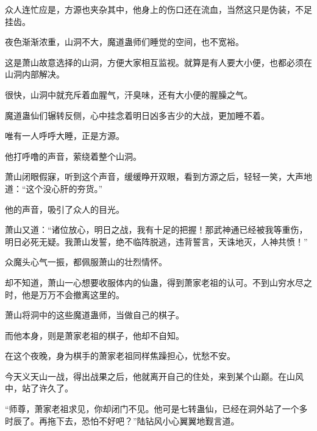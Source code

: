 \begin{this_body}
众人连忙应是，方源也夹杂其中，他身上的伤口还在流血，当然这只是伪装，不足挂齿。

夜色渐渐浓重，山洞不大，魔道蛊师们睡觉的空间，也不宽裕。

这是萧山故意选择的山洞，方便大家相互监视。就算是有人要大小便，也都必须在山洞内部解决。

很快，山洞中就充斥着血腥气，汗臭味，还有大小便的腥臊之气。

魔道蛊仙们辗转反侧，心中挂念着明日凶多吉少的大战，更加睡不着。

唯有一人呼呼大睡，正是方源。

他打呼噜的声音，萦绕着整个山洞。

萧山闭眼假寐，听到这个声音，缓缓睁开双眼，看到方源之后，轻轻一笑，大声地道：“这个没心肝的夯货。”

他的声音，吸引了众人的目光。

萧山又道：“诸位放心，明日之战，我有十足的把握！那武神通已经被我等重伤，明日必死无疑。我萧山发誓，绝不临阵脱逃，违背誓言，天诛地灭，人神共愤！”

众魔头心气一振，都佩服萧山的壮烈情怀。

却不知道，萧山一心想要收服体内的仙蛊，得到萧家老祖的认可。不到山穷水尽之时，他是万万不会撤离这里的。

萧山将洞中的这些魔道蛊师，当做自己的棋子。

而他本身，则是萧家老祖的棋子，他却不自知。

在这个夜晚，身为棋手的萧家老祖同样焦躁担心，忧愁不安。

今天义天山一战，得出战果之后，他就离开自己的住处，来到某个山巅。在山风中，站了许久了。

“师尊，萧家老祖求见，你却闭门不见。他可是七转蛊仙，已经在洞外站了一个多时辰了。再拖下去，恐怕不好吧？”陆钻风小心翼翼地觐言道。

\end{this_body}

